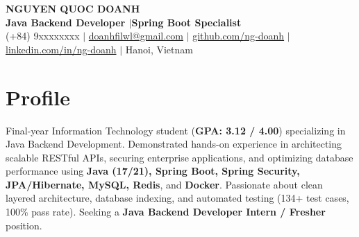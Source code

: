 ﻿\documentclass[10pt,a4paper]{article}
\begin{document}
\begin{center}
    {\LARGE \textbf{NGUYEN QUOC DOANH}} \\[3pt]
    {\normalsize \textbf{Java Backend Developer \enspace$|$\enspace Spring Boot Specialist}} \\[3pt]
    \small
    (+84) 9xxxxxxxx \enspace$|$\enspace 
    \href{mailto:doanhfilwl@gmail.com}{doanhfilwl@gmail.com} \enspace$|$\enspace 
    \href{https://github.com/ng-doanh}{github.com/ng-doanh} \enspace$|$\enspace 
    \href{https://linkedin.com/in/ng-doanh}{linkedin.com/in/ng-doanh} \enspace$|$\enspace 
    Hanoi, Vietnam
\end{center}

\vspace{-4pt}

\section{Profile}
Final-year Information Technology student (\textbf{GPA: 3.12 / 4.00}) specializing in Java Backend Development. Demonstrated hands-on experience in architecting scalable RESTful APIs, securing enterprise applications, and optimizing database performance using \textbf{Java (17/21), Spring Boot, Spring Security, JPA/Hibernate, MySQL, Redis}, and \textbf{Docker}. Passionate about clean layered architecture, database indexing, and automated testing (134+ test cases, 100\% pass rate). Seeking a \textbf{Java Backend Developer Intern / Fresher} position.

\end{document}
